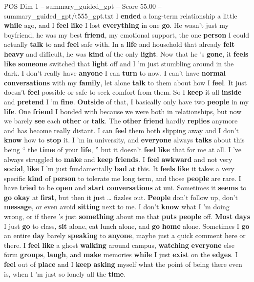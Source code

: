 \begin{textsample}{POS Dim 1 – summary\_guided\_gpt – Score 55.00 – summary\_guided\_gpt/t555\_gpt.txt}  \label{ex:f1_pos_023}
I \textbf{ended} a long-term relationship a little \textbf{while} ago, and I \textbf{feel} \textbf{like} I lost \textbf{everything} in one \textbf{go}.
He wasn't just my boyfriend, he was my best \textbf{friend}, my emotional support, the one \textbf{person} I could actually \textbf{talk} to and \textbf{feel} safe with.
In a \textbf{life} and household that already \textbf{felt} \textbf{heavy} and difficult, he was \textbf{kind} of the only \textbf{light}.
Now that he ’s \textbf{gone}, it \textbf{feels} \textbf{like} \textbf{someone} switched that \textbf{light} off and I ’m just stumbling around in the dark.
I don't really have \textbf{anyone} I can \textbf{turn} to now.
I can't have \textbf{normal} \textbf{conversations} with my \textbf{family}, let alone \textbf{talk} to them about how I \textbf{feel}.
It just doesn't \textbf{feel} possible or safe to seek comfort from them.
So I \textbf{keep} it all \textbf{inside} and \textbf{pretend} I ’m \textbf{fine}. \textbf{Outside} of that, I basically only have two \textbf{people} in my \textbf{life}.
One \textbf{friend} I bonded with because we were both in relationships, but now we barely \textbf{see} each \textbf{other} or \textbf{talk}.
The \textbf{other} \textbf{friend} hardly \textbf{replies} anymore and has become really distant.
I can \textbf{feel} them both slipping away and I don't \textbf{know} how to \textbf{stop} it.
I ’m in university, and \textbf{everyone} always \textbf{talks} about this being “ the \textbf{time} of your \textbf{life}, ” but it doesn't \textbf{feel} \textbf{like} that for me at all.
I ’ve always struggled to \textbf{make} and \textbf{keep} \textbf{friends}.
I \textbf{feel} \textbf{awkward} and not very \textbf{social}, \textbf{like} I ’m just fundamentally \textbf{bad} at this.
It \textbf{feels} \textbf{like} it takes a very specific \textbf{kind} of \textbf{person} to tolerate me long term, and those \textbf{people} are rare.
I have \textbf{tried} to be \textbf{open} and \textbf{start} \textbf{conversations} at uni.
Sometimes it \textbf{seems} to \textbf{go} \textbf{okay} at \textbf{first}, but then it just … fizzles out. \textbf{People} don't follow up, don't \textbf{message}, or even avoid \textbf{sitting} next to me.
I don't \textbf{know} what I ’m doing wrong, or if there ’s just \textbf{something} about me that \textbf{puts} \textbf{people} off. \textbf{Most} \textbf{days} I just \textbf{go} to class, \textbf{sit} alone, eat lunch alone, and \textbf{go} \textbf{home} alone.
Sometimes I \textbf{go} an entire \textbf{day} barely \textbf{speaking} to \textbf{anyone}, maybe just a quick comment here or there.
I \textbf{feel} \textbf{like} a ghost \textbf{walking} around campus, \textbf{watching} \textbf{everyone} else form \textbf{groups}, \textbf{laugh}, and \textbf{make} memories \textbf{while} I just \textbf{exist} on the \textbf{edges}.
I \textbf{feel} out of \textbf{place} and I \textbf{keep} \textbf{asking} myself what the point of being there even is, when I ’m just so lonely all the \textbf{time}.


\end{textsample}
